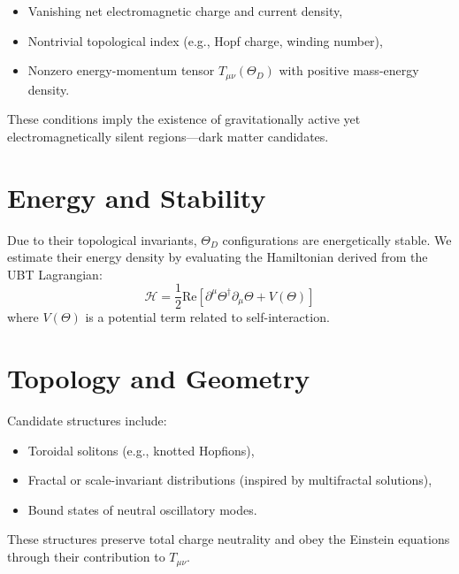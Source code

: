\begin{itemize}
  \item Vanishing net electromagnetic charge and current density,
  \item Nontrivial topological index (e.g., Hopf charge, winding number),
  \item Nonzero energy-momentum tensor \( T_{\mu\nu}(\Theta_D) \) with positive mass-energy density.
\end{itemize}

These conditions imply the existence of gravitationally active yet electromagnetically silent regions—dark matter candidates.

\section{Energy and Stability}
Due to their topological invariants, \( \Theta_D \) configurations are energetically stable. We estimate their energy density by evaluating the Hamiltonian derived from the UBT Lagrangian:
\begin{equation}
\mathcal{H} = \frac{1}{2} \text{Re} \left[ \partial^\mu \Theta^\dagger \partial_\mu \Theta + V(\Theta) \right]
\end{equation}
where \( V(\Theta) \) is a potential term related to self-interaction.

\section{Topology and Geometry}
Candidate structures include:
\begin{itemize}
  \item Toroidal solitons (e.g., knotted Hopfions),
  \item Fractal or scale-invariant distributions (inspired by multifractal solutions),
  \item Bound states of neutral oscillatory modes.
\end{itemize}

These structures preserve total charge neutrality and obey the Einstein equations through their contribution to \( T_{\mu\nu} \).

